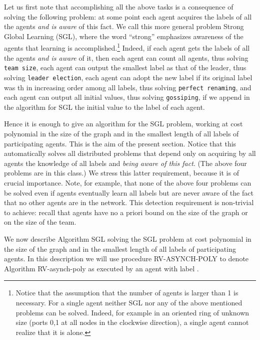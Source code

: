 \documentclass [11pt] {article}
\begin{document}
Let us first note that accomplishing all the above tasks is a consequence of solving the following problem: 
at some point each agent acquires the labels of all the agents {\em and is aware} of this fact. We call this more general problem Strong Global Learning (SGL), where the word ``strong''  emphasizes awareness of the agents that learning is accomplished.\footnote{Notice that the assumption that the number  of agents is larger than 1 is necessary. For a single agent neither SGL nor any of the above mentioned problems can be solved. Indeed,
for example in an oriented ring of unknown size (ports 0,1 at all nodes in the clockwise direction), a single agent cannot realize that it is alone.}
Indeed, if each agent gets the labels of all the agents {\em and is aware} of it, then each agent can count all agents, thus solving
{\tt team size}, each agent can output the smallest label as that of the leader, thus solving {\tt leader election},  each agent can adopt the new label
 if its original label was th in increasing order among all labels, 
thus solving {\tt perfect renaming}, and each agent can output all initial values,
thus solving {\tt gossiping},  if we append in the algorithm for SGL the initial value to the label of each agent.

Hence it is enough to give an algorithm for the SGL problem, working at cost polynomial in the size of the graph 
and in the smallest length of all labels of participating agents. This is the aim of the present section. Notice that this automatically solves all
distributed problems that depend only on acquiring by all agents the knowledge of all labels and {\em being aware of this fact}.
(The above four problems are in this class.) We stress this latter requirement, because it is of crucial importance. Note, for example, that none of the above four problems can be solved even if agents
eventually learn all
labels but are never aware of the fact that no other agents are in the network. 
This detection requirement is non-trivial to achieve: recall that agents have 
no a priori bound on the size of the graph or on the size of the team. 


We now describe Algorithm SGL solving the SGL problem at cost polynomial in the size of the graph 
and in the smallest length of all labels of participating agents.  In this description we will use procedure RV-ASYNCH-POLY to denote Algorithm RV-asynch-poly
as executed by an agent with label . 

\vspace*{0.3cm}
\end{document}
